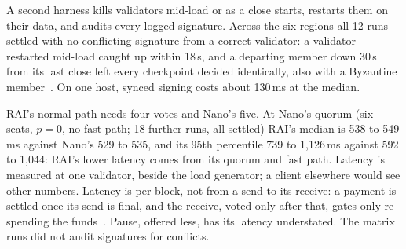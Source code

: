 A second harness kills validators mid-load or as a close starts, restarts them on their data, and audits every logged signature. Across the six regions all 12 runs settled with no conflicting signature from a correct validator: a validator restarted mid-load caught up within 18\,s, and a departing member down 30\,s from its last close left every checkpoint decided identically, also with a Byzantine member~\cite{extended}. On one host, synced signing costs about 130\,ms at the median.

RAI's normal path needs four votes and Nano's five. At Nano's quorum (six seats, $p=0$, no fast path; 18 further runs, all settled) RAI's median is 538 to 549\,ms against Nano's 529 to 535, and its 95th percentile 739 to 1{,}126\,ms against 592 to 1{,}044: RAI's lower latency comes from its quorum and fast path. Latency is measured at one validator, beside the load generator; a client elsewhere would see other numbers. Latency is per block, not from a send to its receive: a payment is settled once its send is final, and the receive, voted only after that, gates only re-spending the funds~\cite{extended}. Pause, offered less, has its latency understated. The matrix runs did not audit signatures for conflicts.
